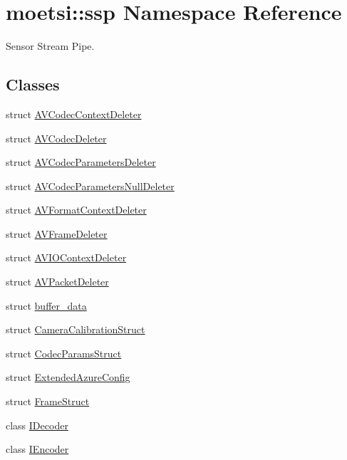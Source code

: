 \hypertarget{namespacemoetsi_1_1ssp}{}\section{moetsi\+:\+:ssp Namespace Reference}
\label{namespacemoetsi_1_1ssp}


Sensor Stream Pipe.  


\subsection*{Classes}
\begin{DoxyCompactItemize}
\item 
struct \hyperlink{structmoetsi_1_1ssp_1_1AVCodecContextDeleter}{A\+V\+Codec\+Context\+Deleter}
\item 
struct \hyperlink{structmoetsi_1_1ssp_1_1AVCodecDeleter}{A\+V\+Codec\+Deleter}
\item 
struct \hyperlink{structmoetsi_1_1ssp_1_1AVCodecParametersDeleter}{A\+V\+Codec\+Parameters\+Deleter}
\item 
struct \hyperlink{structmoetsi_1_1ssp_1_1AVCodecParametersNullDeleter}{A\+V\+Codec\+Parameters\+Null\+Deleter}
\item 
struct \hyperlink{structmoetsi_1_1ssp_1_1AVFormatContextDeleter}{A\+V\+Format\+Context\+Deleter}
\item 
struct \hyperlink{structmoetsi_1_1ssp_1_1AVFrameDeleter}{A\+V\+Frame\+Deleter}
\item 
struct \hyperlink{structmoetsi_1_1ssp_1_1AVIOContextDeleter}{A\+V\+I\+O\+Context\+Deleter}
\item 
struct \hyperlink{structmoetsi_1_1ssp_1_1AVPacketDeleter}{A\+V\+Packet\+Deleter}
\item 
struct \hyperlink{structmoetsi_1_1ssp_1_1buffer__data}{buffer\+\_\+data}
\item 
struct \hyperlink{structmoetsi_1_1ssp_1_1CameraCalibrationStruct}{Camera\+Calibration\+Struct}
\item 
struct \hyperlink{structmoetsi_1_1ssp_1_1CodecParamsStruct}{Codec\+Params\+Struct}
\item 
struct \hyperlink{structmoetsi_1_1ssp_1_1ExtendedAzureConfig}{Extended\+Azure\+Config}
\item 
struct \hyperlink{structmoetsi_1_1ssp_1_1FrameStruct}{Frame\+Struct}
\item 
class \hyperlink{classmoetsi_1_1ssp_1_1IDecoder}{I\+Decoder}
\item 
class \hyperlink{classmoetsi_1_1ssp_1_1IEncoder}{I\+Encoder}

\end{DoxyCompactItemize}
